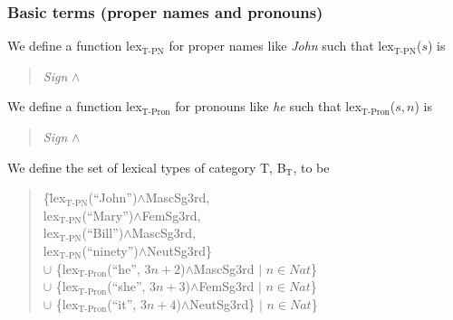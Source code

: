 \subsubsection{Basic terms (proper names and pronouns)}
We define a function lex$_{\mathrm{T}\textrm{-}\mathrm{PN}}$ for
proper names like
\textit{John} such that
lex$_{\mathrm{T}\textrm{-}\mathrm{PN}}$($s$) is
\begin{quote}
\textit{Sign} \d{$\wedge$} \\
\end{quote}
We define a function lex$_{\mathrm{T}\textrm{-}\mathrm{Pron}}$ for
pronouns like
\textit{he} such that
lex$_{\mathrm{T}\textrm{-}\mathrm{Pron}}$($s,n$) is
\begin{quote}
\textit{Sign} \d{$\wedge$} \\
\end{quote}

We define the set of lexical types of category T,
B$_{\mathrm{T}}$, to be
\begin{quote}
\begin{tabbing}
\{\=lex$_{\mathrm{T}\textrm{-}\mathrm{PN}}$(``John'')\d{$\wedge$}MascSg3rd, \\
  \>lex$_{\mathrm{T}\textrm{-}\mathrm{PN}}$(``Mary'')\d{$\wedge$}FemSg3rd, \\
  \>lex$_{\mathrm{T}\textrm{-}\mathrm{PN}}$(``Bill'')\d{$\wedge$}MascSg3rd, \\
  \>lex$_{\mathrm{T}\textrm{-}\mathrm{PN}}$(``ninety'')\d{$\wedge$}NeutSg3rd\} \\
$\cup$
\{lex$_{\mathrm{T}\textrm{-}\mathrm{Pron}}$(``he'', $3n+2$)\d{$\wedge$}MascSg3rd $\mid$ $n \in
\mathit{Nat}$\} \\
$\cup$
\{lex$_{\mathrm{T}\textrm{-}\mathrm{Pron}}$(``she'', $3n+3$)\d{$\wedge$}FemSg3rd $\mid$ $n \in
\mathit{Nat}$\} \\
$\cup$
\{lex$_{\mathrm{T}\textrm{-}\mathrm{Pron}}$(``it'', $3n+4$)\d{$\wedge$}NeutSg3rd\} $\mid$ $n \in
\mathit{Nat}$\}
\end{tabbing}
\end{quote}

